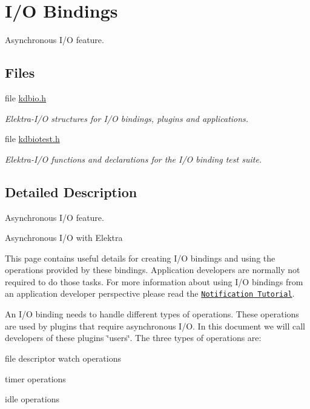 \hypertarget{group__kdbio}{}\section{I/O Bindings}
\label{group__kdbio}


Asynchronous I/O feature.  


\subsection*{Files}
\begin{DoxyCompactItemize}
\item 
file \hyperlink{kdbio_8h}{kdbio.\+h}
\begin{DoxyCompactList}\small\item\em Elektra-\/\+I/O structures for I/O bindings, plugins and applications. \end{DoxyCompactList}\item 
file \hyperlink{kdbiotest_8h}{kdbiotest.\+h}
\begin{DoxyCompactList}\small\item\em Elektra-\/\+I/O functions and declarations for the I/O binding test suite. \end{DoxyCompactList}\end{DoxyCompactItemize}


\subsection{Detailed Description}
Asynchronous I/O feature. 

\begin{DoxyParagraph}{Asynchronous I/O with Elektra}

\end{DoxyParagraph}
This page contains useful details for creating I/O bindings and using the operations provided by these bindings. Application developers are normally not required to do those tasks. For more information about using I/O bindings from an application developer perspective please read the \href{doc_tutorials_notifications_md.html}{\tt Notification Tutorial}.

An I/O binding needs to handle different types of operations. These operations are used by plugins that require asynchronous I/O. In this document we will call developers of these plugins \char`\"{}users\char`\"{}. The three types of operations are\+:
\begin{DoxyItemize}
\item file descriptor watch operations
\item timer operations
\item idle operations
\end{DoxyItemize}

